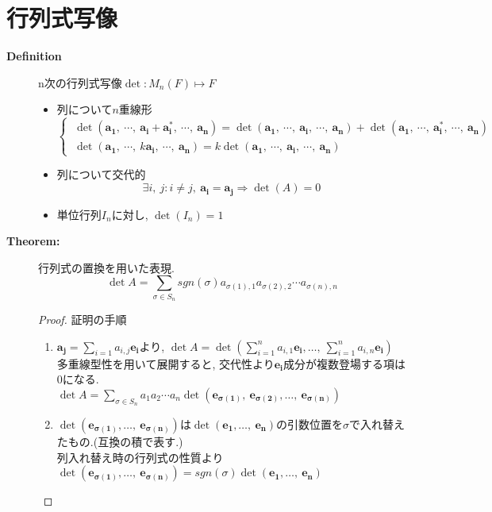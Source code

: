 \documentclass[dvipdfmx]{jsarticle}
\begin{document}
\section{行列式写像}
    \begin{description}
        \item[\bf{Definition}] n次の行列式写像$\det: M_n(F) \mapsto F$
            \begin{itemize}
                \item 列について$n$重線形
                    \begin{equation*} 
                        \begin{cases}
                        \ \det(\bm{a_1},\ \cdots,\ \bm{a_i} + \bm{a^*_i},\ \cdots,\ \bm{a_n}) = \det(\bm{a_1},\ \cdots,\ \bm{a_i},\ \cdots,\ \bm{a_n}) + \det(\bm{a_1},\ \cdots,\ \bm{a^*_i},\ \cdots,\ \bm{a_n}) \\
                        \ \det(\bm{a_1},\ \cdots,\ k \bm{a_i},\ \cdots,\ \bm{a_n}) = k \det(\bm{a_1},\ \cdots,\ \bm{a_i},\ \cdots,\ \bm{a_n}) 
                        \end{cases}
                    \end{equation*}
                \item 列について交代的
                    $$\exists i,\ j : i \neq j,\ \bm{a_i} = \bm{a_j} \Rightarrow \det(A) = 0$$
                \item 単位行列$I_n$に対し, $\det(I_n) = 1$
            \end{itemize}

        \item[\bf{Theorem:}] 行列式の置換を用いた表現.
            $$ \det A = \sum_{\sigma \in S_n} sgn(\sigma) a_{\sigma(1),1} a_{\sigma(2),2} \cdots a_{\sigma(n),n} $$
            \begin{proof} 証明の手順
                \begin{enumerate}
                    \item $\bm{a_j} = \sum_{i=1} a_{i, j} \bm{e_i}$より, $\det A = \det ( \sum_{i=1}^n a_{i,1}\bm{e_i}, \dots,\ \sum_{i=1}^n a_{i,n}\bm{e_i} )$ \\
                    多重線型性を用いて展開すると, 交代性より$\bm{e_i}$成分が複数登場する項は0になる. \\
                    $\det A = \sum_{\sigma \in S_n} a_1a_2 \cdots a_n \det (\bm{e_{\sigma(1)}},\ \bm{e_{\sigma(2)}}, \dots,\ \bm{e_{\sigma(n)}} ) $
                    \item $\det (\bm{e_{\sigma(1)}}, \dots,\ \bm{e_{\sigma(n)}} )$は$\det (\bm{e_1}, \dots,\ \bm{e_n} )$の引数位置を$\sigma$で入れ替えたもの.(互換の積で表す.) \\
                        列入れ替え時の行列式の性質より$\det (\bm{e_{\sigma(1)}}, \dots,\ \bm{e_{\sigma(n)}} ) = sgn(\sigma) \det (\bm{e_1}, \dots,\ \bm{e_n} )$
                \end{enumerate}
            \end{proof}


\end{description}
\end{document}
